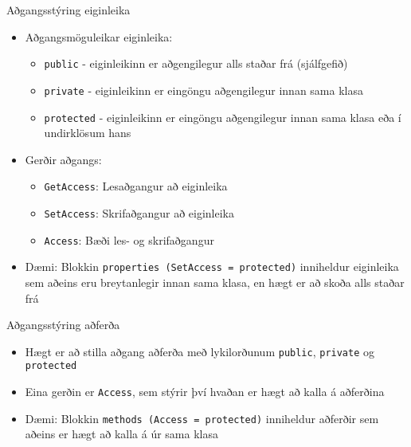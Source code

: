 \documentclass{beamer}
\begin{document}
\begin{frame}{Aðgangsstýring eiginleika}
\begin{itemize}
 \item Aðgangsmöguleikar eiginleika:
 \begin{itemize}
  \item \texttt{public} - eiginleikinn er aðgengilegur alls staðar frá (sjálfgefið)
  \item \texttt{private} - eiginleikinn er eingöngu aðgengilegur innan sama klasa
  \item \texttt{protected} - eiginleikinn er eingöngu aðgengilegur innan sama klasa eða í undirklösum hans 
 \end{itemize}
 \item Gerðir aðgangs:
 \begin{itemize}
  \item \texttt{GetAccess}: Lesaðgangur að eiginleika
  \item \texttt{SetAccess}: Skrifaðgangur að eiginleika
  \item \texttt{Access}: Bæði les- og skrifaðgangur
 \end{itemize}
 \item Dæmi: Blokkin \texttt{properties (SetAccess = protected)} inniheldur eiginleika sem aðeins eru breytanlegir innan sama klasa, en hægt er að skoða alls staðar frá
\end{itemize}
\end{frame}

\begin{frame}{Aðgangsstýring aðferða}
\begin{itemize}
 \item Hægt er að stilla aðgang aðferða með lykilorðunum \texttt{public}, \texttt{private} og \texttt{protected}
 \item Eina gerðin er \texttt{Access}, sem stýrir því hvaðan er hægt að kalla á aðferðina
 \item Dæmi: Blokkin \texttt{methods (Access = protected)} inniheldur aðferðir sem aðeins er hægt að kalla á úr sama klasa
\end{itemize}
\end{frame}
\end{document}
